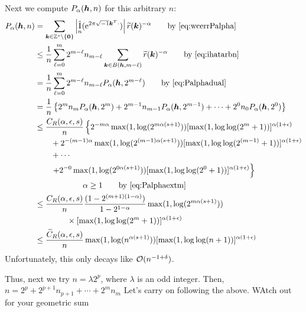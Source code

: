 \documentclass{amsart}
\newcommand{\tr}{\widetilde{r}}
\DeclareMathOperator{\appxint}{\hat{I}}
\newcommand{\FredNote}[1]{{\color{blue}#1}}
\begin{document}
Next we compute $P_\alpha(\boldsymbol{h},n)$ for this arbitrary $n$:
\begin{align*}
      P_\alpha(\vh,n) & = \sum_{\vk \in \integers^s \setminus\{\vzero\}} \abs{\appxint_n(\me^{2 \pi \sqrt{-1} \vk^T \cdot})}\tr(\vk)^{-\alpha} \qquad \text{by \eqref{eq:wcerrPalpha}} \\
      & \le \frac {1}{n} \sum_{\ell = 0}^{m} 2^{m-\ell} n_{m - \ell} \sum_{\vk \in B(\vh,m-\ell)} \tr(\vk)^{-\alpha}
      \qquad \text{by \eqref{eq:ihatarbn}}\\
      & = \frac {1}{n} \sum_{\ell = 0}^{m} 2^{m-\ell} n_{m - \ell} P_\alpha(\vh,2^{m-\ell})
      \qquad \text{by \eqref{eq:Palphadual}}\\
      & =  \frac {1}{n} \left\{ 2^m n_m P_\alpha(\vh,2^m) + 2^{m-1} n_{m-1} P_\alpha(\vh,2^{m-1}) + \cdots + 2^0 n_0 P_\alpha(\vh,2^0)  \right\} \\
      & \le \frac {C_{R}(\alpha,\epsilon,s)}{n} \left\{ 2^{-m\alpha}\max(1, \log(2^{m\alpha(s+1)})) [\max(1,\log \log (
    2^m+1))]^{\alpha(1+\epsilon)}\right .\\
      & \qquad  + 2^{-(m-1)\alpha}\max(1, \log(2^{(m-1)\alpha(s+1)})) [\max(1,\log \log (
    2^{(m-1)}+1))]^{\alpha(1+\epsilon)}\\
      & \qquad + \cdots \\
      & \qquad  \left . + 2^{-0}\max(1, \log(2^{0\alpha(s+1)})) [\max(1,\log \log (
    2^{0}+1))]^{\alpha(1+\epsilon)} \right\}\\
      & \qquad \qquad \qquad \alpha \ge 1 \qquad \text{by \eqref{eq:Palphaextm}}\\
      & \le \frac {C_{R}(\alpha,\epsilon,s)}{n} \frac{(1 - 2^{(m+1)(1-\alpha)})}{1 - 2^{1-\alpha}}
      \max(1, \log(2^{m\alpha(s+1)})) \\
      & \qquad \qquad \times [\max(1,\log \log (
    2^m+1))]^{\alpha(1+\epsilon)} \\
      & \le \frac {\widetilde{C}_{R}(\alpha,\epsilon,s)}{n}
      \max(1, \log(n^{\alpha(s+1)}))
      [\max(1,\log \log (
    n+1))]^{\alpha(1+\epsilon)}
\end{align*}
Unfortunately, this only decays like $\operatorname{{\mathcal O}}(n^{-1+\delta})$.


Thus, next we try $n = \lambda 2^p$, where $\lambda$ is an odd integer. Then, $n = 2^p + 2^{p+1}n_{p+1} + \cdots + 2^m n_m$
\FredNote{Let's carry on following the above.  WAtch out for your geometric sum} \\
\end{document}
